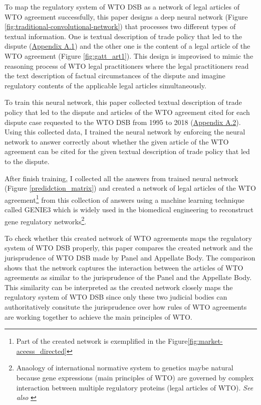 To map the regulatory system of WTO DSB as 
a network of legal articles of WTO agreement 
successfully,
this paper designs a deep neural network (Figure \ref{fig:traditional-convolutional-network}) that
processes two different types of textual information.
One is textual description of trade policy that led to the dispute (\hyperref[sub:factual-aspect-example]{Appendix A.1}) and
the other one is the content of a legal article of the WTO agreement (Figure \ref{fig:gatt_art1}).
This design is improvised to mimic
the reasoning process of WTO legal practitioners
where the legal practitioners read
the text description of
factual circumstances of the dispute and imagine regulatory contents of
the applicable legal articles simultaneously.


To train this neural network, this paper collected textual description of trade policy 
that led to the dispute and articles of the WTO agreement cited for each dispute
case requested to the WTO DSB 
from 1995 to 2018 (\hyperref[sub:cited-articles-table]{Appendix A.2}).
Using this collected data, I trained the neural network by enforcing the neural network to answer correctly 
about whether the given article of the WTO agreement
can be cited for the given textual description of 
trade policy that led to the dispute.

After finish training, I collected all the answers from trained neural network (Figure \ref{predidction_matrix})
and created a network of legal articles of the WTO agreement\footnote{Part of the created network is exemplified in the Figure\ref{fig:market-aceess_directed}} from this collection of answers using a machine learning technique called GENIE3 \citep{genie3} 
which is widely used in the biomedical engineering to reconstruct gene regulatory networks\footnote{Anaology of international normative system to genetics maybe natural because gene expressions (main principles of WTO) are governed by complex interaction between multiple regulatory proteins (legal articles of WTO). \textit{See also} \cite{gene_analogy}}.

To check whether this created network of WTO agreements maps the regulatory system of WTO DSB properly, this paper
compares the created network and the jurisprudence of WTO DSB made by Panel and Appellate Body. 
The comparison shows that the network captures the interaction between the articles of WTO agreements
as similar to the jurisprudence of the Panel and the Appellate Body. This similarity can be interpreted 
as the created network closely maps the regulatory system of WTO DSB since only these two judicial bodies 
can authoritatively consitute the jurisprudence over how rules of WTO agreements are working together 
to achieve the main principles of WTO.

